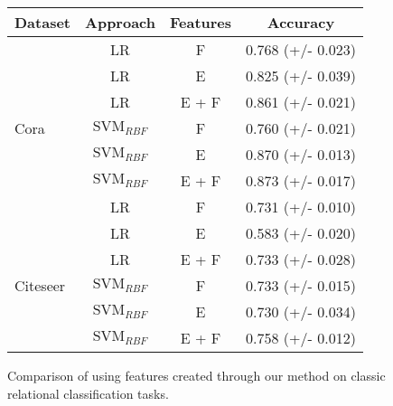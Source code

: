 \begin{figure}
\begin{center}
  \begin{tabular}{ l | c | c | c}
    Dataset & Approach & Features & Accuracy \\
    \hline
    \hline    
    			&LR		& F 			& 0.768 	(+/-	0.023)\\    			
    			&LR 	& E 			& 0.825	(+/-	0.039)\\
    		 	&LR 	& E + F 		& 0.861	(+/-	0.021)\\        	
    	Cora	&$\text{SVM}_{RBF}$	& F 			& 0.760	(+/-	0.021)\\    			
    			&$\text{SVM}_{RBF}$		& E 			& 0.870	(+/-	0.013)\\
    		 	&$\text{SVM}_{RBF}$	 	& E + F 		& 0.873	(+/-	0.017)\\        	
    \hline
    			&LR		& F 			& 0.731	(+/-	0.010)\\    			
    			&LR 	& E 			& 0.583	(+/-	0.020)\\
    		 	&LR 	& E + F 		& 0.733	(+/-	0.028)\\        	
    	Citeseer	&$\text{SVM}_{RBF}$	& F 			& 0.733	(+/-	0.015)\\    			
    			&$\text{SVM}_{RBF}$ 	& E 			& 0.730 (+/- 0.034)\\
    		 	&$\text{SVM}_{RBF}$ 	& E + F 		& 0.758 (+/- 0.012)\\        	    
	\hline
  \end{tabular}
  \caption{Comparison of using features created through our method on classic relational classification tasks.}
\end{center}
\end{figure}